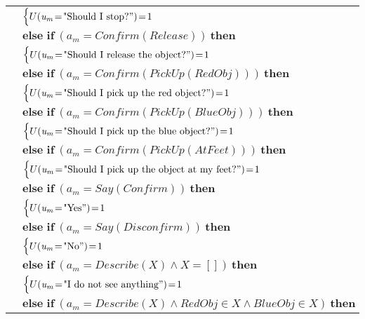 \begin{footnotesize}
\begin{longtable}{p{2cm}l}
& \;\;\;\;\; $ \begin{cases}U(\mathit{u_m}\!=\!\text{"Should I stop?}")\!=\!1 \end{cases}$\\[3mm] & $ \textbf{else if} \ (\mathit{a_m}\!=\!\mathit{Confirm(Release)}) \ \textbf{then}$ \\
& \;\;\;\;\; $ \begin{cases}U(\mathit{u_m}\!=\!\text{"Should I release the object?}")\!=\!1 \end{cases}$\\[3mm] & $ \textbf{else if} \ (\mathit{a_m}\!=\!\mathit{Confirm(PickUp(RedObj))}) \ \textbf{then}$ \\
& \;\;\;\;\; $ \begin{cases}U(\mathit{u_m}\!=\!\text{"Should I pick up the red object?}")\!=\!1 \end{cases}$\\[3mm] & $ \textbf{else if} \ (\mathit{a_m}\!=\!\mathit{Confirm(PickUp(BlueObj))}) \ \textbf{then}$ \\
& \;\;\;\;\; $ \begin{cases}U(\mathit{u_m}\!=\!\text{"Should I pick up the blue object?}")\!=\!1 \end{cases}$\\[3mm] & $ \textbf{else if} \ (\mathit{a_m}\!=\!\mathit{Confirm(PickUp(AtFeet))}) \ \textbf{then}$ \\
& \;\;\;\;\; $ \begin{cases}U(\mathit{u_m}\!=\!\text{"Should I pick up the object at my feet?}")\!=\!1 \end{cases}$\\[3mm] & $ \textbf{else if} \ (\mathit{a_m}\!=\!\mathit{Say(Confirm)}) \ \textbf{then}$ \\
& \;\;\;\;\; $ \begin{cases}U(\mathit{u_m}\!=\!\text{"Yes}")\!=\!1 \end{cases}$\\[3mm] & $ \textbf{else if} \ (\mathit{a_m}\!=\!\mathit{Say(Disconfirm)}) \ \textbf{then}$ \\
& \;\;\;\;\; $ \begin{cases}U(\mathit{u_m}\!=\!\text{"No}")\!=\!1 \end{cases}$\\[3mm] & $ \textbf{else if} \ (\mathit{a_m}\!=\!\mathit{Describe({X})} \land \mathit{X}\!=\!\mathit{[]}) \ \textbf{then}$ \\
& \;\;\;\;\; $ \begin{cases}U(\mathit{u_m}\!=\!\text{"I do not see anything}")\!=\!1 \end{cases}$\\[3mm] & $ \textbf{else if} \ (\mathit{a_m}\!=\!\mathit{Describe({X})} \land \mathit{RedObj}\!\in\!\mathit{X} \land \mathit{BlueObj}\!\in\!\mathit{X}) \ \textbf{then}$ \\

\end{longtable}
\end{footnotesize}

